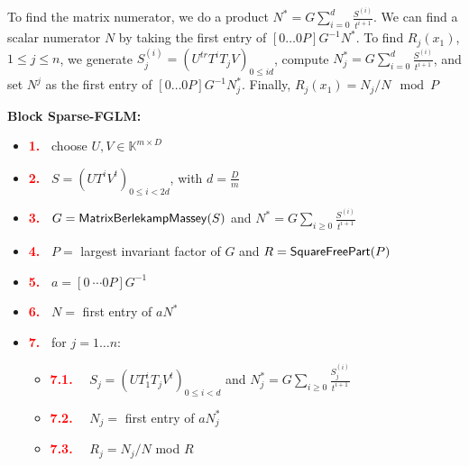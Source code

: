 \documentclass[12pt]{article}
\begin{document}
To find the matrix numerator, we do a product 
$N^* = G\sum_{i=0}^{d} \frac{S^{(i)}} {t^{i+1}}$. We can find a
scalar numerator $N$ by taking the first entry of 
$[0 \dots 0 P] G^{-1} N^*$. To find $R_j(x_1)$, $1 \le j \le n$,
we generate $S^{(i)}_j = (U^{tr} T^i T_j V)_{0 \le i d}$,
compute $N^*_j = G \sum_{i=0}^{d} \frac{S^{(i)}} {t^{i+1}}$,
and set $N^j$ as the first entry of 
$[0 \dots 0 P] G^{-1} N^*_j$. Finally, $R_j(x_1) = N_j / N \mod P$

\begin{center}
	\textbf{Block Sparse-FGLM:}
	\begin{itemize}
		\item[]\textcolor{red}{\bf 1.~} {\sf choose $U,V \in \mathbb{K}^{m \times D}$}
		\item[]\textcolor{red}{\bf 2.~} {\sf $S= (UT^iV^t)_{0 \le i < 2d}$, with $d = \frac{D}{m}$}
		\item[]\textcolor{red}{\bf 3.~} {\sf $G = {\sf MatrixBerlekampMassey}(S)$ and $N^* = G\sum_{i\ge 0} \frac{S^{(i)}}{t^{i+1}}$}
		\item[]\textcolor{red}{\bf 4.~} {\sf $P=$ largest invariant factor of $G$ and $R={\sf SquareFreePart}(P)$}
		\item[]\textcolor{red}{\bf 5.~} {\sf $a = [0 ~\cdots 0 P] G^{-1}$}
		\item[]\textcolor{red}{\bf 6.~} {\sf $N=$ first entry of $aN^*$}
		\item[]\textcolor{red}{\bf 7.~} {\sf for $j = 1 \dots n$:}
		\begin{itemize}
			\item[]\textcolor{red}{\bf 7.1.} ~~{\sf $S_j = (UT_1^i T_j V^t)_{0 \le i < d}$ and $N_j^* = G\sum_{i\ge 0} \frac{S_j^{(i)}}{t^{i+1}}$}
			\item[]\textcolor{red}{\bf 7.2.} ~~{\sf $N_j=$ first entry of $aN_j^*$}
			\item[]\textcolor{red}{\bf 7.3.} ~~{\sf $R_j=N_j/N$ mod $R$}
		\end{itemize}
	\end{itemize}
\end{center}
\end{document}
